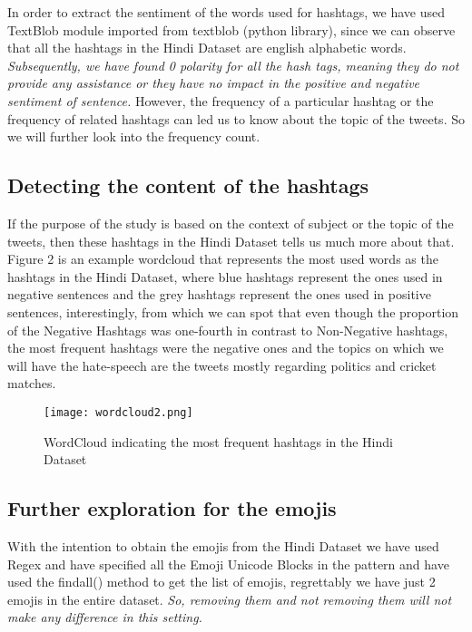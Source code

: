 \documentclass{article}
\begin{document}
In order to extract the sentiment of the words used for hashtags, we have used TextBlob module imported from textblob (python library), since we can observe that all the hashtags in the Hindi Dataset are english alphabetic words. \textit{Subsequently, we have found 0 polarity for all the hash tags, meaning they do not provide any assistance or they have no impact in the positive and negative sentiment of sentence.} However, the frequency of a particular hashtag or the frequency of related hashtags can led us to know about the topic of the tweets. So we will further look into the frequency count.

\subsection{Detecting the content of the hashtags}

If the purpose of the study is based on the context of subject or the topic of the tweets, then these hashtags in the Hindi Dataset tells us much more about that. Figure 2 is an example wordcloud that represents the most used words as the hashtags in the Hindi Dataset, where blue hashtags represent the ones used in negative sentences and the grey hashtags represent the ones used in positive sentences, interestingly, from which we can spot that even though the proportion of the Negative Hashtags was one-fourth in contrast to Non-Negative hashtags, the most frequent hashtags were the negative ones and the topics on which we will have the hate-speech are the tweets mostly regarding politics and cricket matches.

\begin{figure}[b]
  \centering
  \texttt{[image: wordcloud2.png]}
  \caption{WordCloud indicating the most frequent hashtags in the Hindi Dataset}
\end{figure}

\subsection{Further exploration for the emojis}

With the intention to obtain the emojis from the Hindi Dataset we have used Regex and have specified all the Emoji Unicode Blocks in the pattern and have used the findall() method to get the list of emojis, regrettably we have just 2 emojis in the entire dataset. \textit{So, removing them and not removing them will not make any difference in this setting.  }
\end{document}
